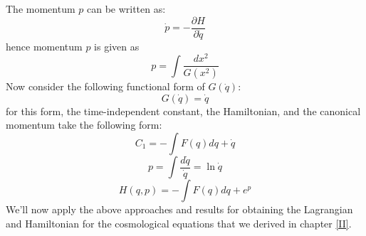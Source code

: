\documentclass[12pt]{article}
\begin{document}
The momentum $p$ can be written as:
\begin{equation}
\dot{p}=-\frac{\partial H}{\partial \dot{q}}
\end{equation}
hence momentum $p$ is given as
\begin{equation}
p=\int \frac{d x^{2}}{G\left(x^{2}\right)}
\end{equation}
Now consider the following functional form of $G(\dot{q})$:
\begin{equation}
G(\dot{q})=\dot{q}
\end{equation}
for this form, the time-independent constant, the Hamiltonian, and the canonical momentum take the following form:
\begin{equation}
C_{1}=-\int F(q) d q+\dot{q}
\end{equation}
\begin{equation}
p=\int \frac{d \dot{q}}{\dot{q}}=\ln \dot{q}
\end{equation}
\begin{equation}
H(q, p)=-\int F(q) d q+e^{p}
\end{equation}
We'll now apply the above approaches and results for obtaining the Lagrangian and Hamiltonian for the cosmological equations that we derived in chapter \ref{II}.
\end{document}
